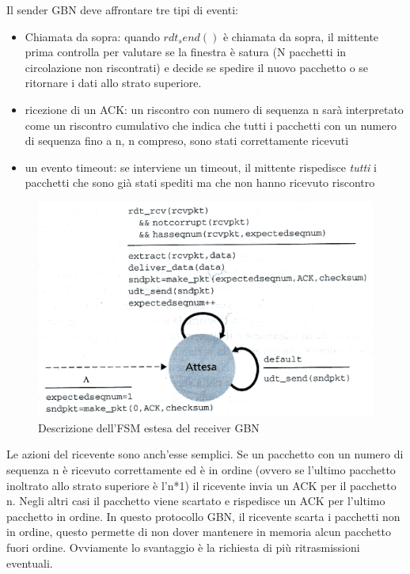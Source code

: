 \documentclass[11pt,a4paper]{book}
\begin{document}
Il sender GBN deve affrontare tre tipi di eventi:
\begin{itemize}
	\item Chiamata da sopra: quando $rdt_send()$ è chiamata da sopra, il mittente prima controlla per valutare se la finestra è satura (N pacchetti in circolazione non riscontrati) e decide se spedire il nuovo pacchetto o se ritornare i dati allo strato superiore.
	\item ricezione di un ACK: un riscontro con numero di sequenza n sarà interpretato come un riscontro cumulativo che indica che tutti i pacchetti con un numero di sequenza fino a n, n compreso, sono stati correttamente ricevuti
	\item un evento timeout: se interviene un timeout, il mittente rispedisce \emph{tutti} i pacchetti che sono già stati spediti ma che non hanno ricevuto riscontro
\end{itemize}
\begin{figure}
	\includegraphics[scale=0.6]{img/027.png}
	\caption{Descrizione dell'FSM estesa del receiver GBN}
\end{figure}
Le azioni del ricevente sono anch'esse semplici. Se un pacchetto con un numero di sequenza n è ricevuto correttamente ed è in ordine (ovvero se l'ultimo pacchetto inoltrato allo strato superiore è l'n*1) il ricevente invia un ACK per il pacchetto n. Negli altri casi il pacchetto viene scartato e rispedisce un ACK per l'ultimo pacchetto in ordine. In questo protocollo GBN, il ricevente scarta i pacchetti non in ordine, questo permette di non dover mantenere in memoria alcun pacchetto fuori ordine. Ovviamente lo svantaggio è la richiesta di più ritrasmissioni eventuali.
\end{document}
